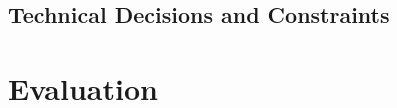 \documentclass[logo,msc]{infthesis}
\begin{document}
\section{Technical Decisions and Constraints}
%
%
%
%


\chapter{Evaluation}
\end{document}
